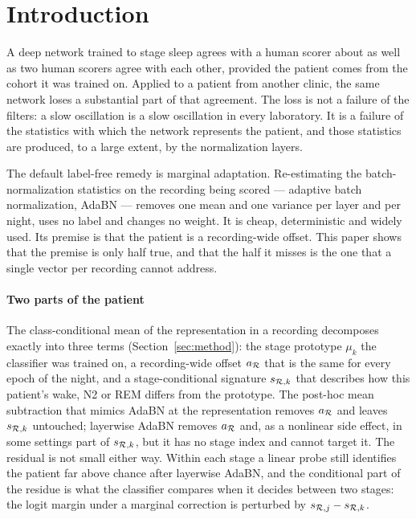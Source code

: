 \section{Introduction}
\label{sec:intro}

A deep network trained to stage sleep agrees with a human scorer about as well
as two human scorers agree with each other, provided the patient comes from the
cohort it was trained on. Applied to a patient from another clinic, the same
network loses a substantial part of that agreement. The loss is not a failure
of the filters: a slow oscillation is a slow oscillation in every laboratory.
It is a failure of the statistics with which the network represents the
patient, and those statistics are produced, to a large extent, by the
normalization layers.

The default label-free remedy is marginal adaptation. Re-estimating the
batch-normalization statistics on the recording being scored --- adaptive batch
normalization, AdaBN \citep{li2018adabn} --- removes one mean and one variance
per layer and per night, uses no label and changes no weight. It is cheap,
deterministic and widely used. Its premise is that the patient is a
recording-wide offset. This paper shows that the premise is only half true,
and that the half it misses is the one that a single vector per recording
cannot address.

\paragraph{Two parts of the patient}
The class-conditional mean of the representation in a recording decomposes
exactly into three terms (Section~\ref{sec:method}): the stage prototype
$\mu_k$ the classifier was trained on, a recording-wide offset
$a_{\mathcal{R}}$ that is the same for every epoch of the night, and a
stage-conditional signature $s_{\mathcal{R},k}$ that describes how this patient's
wake, N2 or REM differs from the prototype. The post-hoc mean subtraction
that mimics AdaBN at the representation removes $a_{\mathcal{R}}$ and leaves
$s_{\mathcal{R},k}$ untouched; layerwise AdaBN removes $a_{\mathcal{R}}$ and, as a nonlinear
side effect, in some settings part of $s_{\mathcal{R},k}$, but it has no stage index
and cannot target it. The residual is not small either way. Within each stage a linear probe
still identifies the patient far above chance after layerwise AdaBN, and the
conditional part of the residue is what the classifier compares when it
decides between two stages: the logit margin under a marginal correction is
perturbed by $s_{\mathcal{R},j}-s_{\mathcal{R},k}$.

